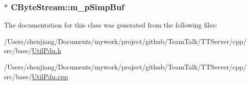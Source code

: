\subsubsection[{m\+\_\+p\+Simp\+Buf}]{$\ast$ C\+Byte\+Stream\+::m\+\_\+p\+Simp\+Buf\hspace{0.3cm}{\ttfamily [private]}}\label{class_c_byte_stream_a06db10598cb5c2657dade90ba20fd59a}


The documentation for this class was generated from the following files\+:\begin{DoxyCompactItemize}
\item 
/\+Users/chenjiang/\+Documents/mywork/project/github/\+Team\+Talk/\+T\+T\+Server/cpp/src/base/\hyperlink{_util_pdu_8h}{Util\+Pdu.\+h}\item 
/\+Users/chenjiang/\+Documents/mywork/project/github/\+Team\+Talk/\+T\+T\+Server/cpp/src/base/\hyperlink{_util_pdu_8cpp}{Util\+Pdu.\+cpp}\end{DoxyCompactItemize}
